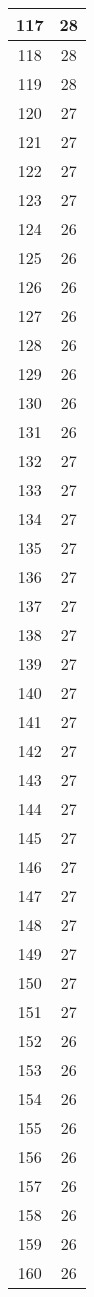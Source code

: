 \documentclass[letterpaper, 12pt]{article}
\begin{document}
\begin{longtable}{|c|c|}
\hline
117 & 28 \\
\hline
118 & 28 \\
\hline
119 & 28 \\
\hline
120 & 27 \\
\hline
121 & 27 \\
\hline
122 & 27 \\
\hline
123 & 27 \\
\hline
124 & 26 \\
\hline
125 & 26 \\
\hline
126 & 26 \\
\hline
127 & 26 \\
\hline
128 & 26 \\
\hline
129 & 26 \\
\hline
130 & 26 \\
\hline
131 & 26 \\
\hline
132 & 27 \\
\hline
133 & 27 \\
\hline
134 & 27 \\
\hline
135 & 27 \\
\hline
136 & 27 \\
\hline
137 & 27 \\
\hline
138 & 27 \\
\hline
139 & 27 \\
\hline
140 & 27 \\
\hline
141 & 27 \\
\hline
142 & 27 \\
\hline
143 & 27 \\
\hline
144 & 27 \\
\hline
145 & 27 \\
\hline
146 & 27 \\
\hline
147 & 27 \\
\hline
148 & 27 \\
\hline
149 & 27 \\
\hline
150 & 27 \\
\hline
151 & 27 \\
\hline
152 & 26 \\
\hline
153 & 26 \\
\hline
154 & 26 \\
\hline
155 & 26 \\
\hline
156 & 26 \\
\hline
157 & 26 \\
\hline
158 & 26 \\
\hline
159 & 26 \\
\hline
160 & 26 \\
\hline

\end{longtable}
\end{document}
